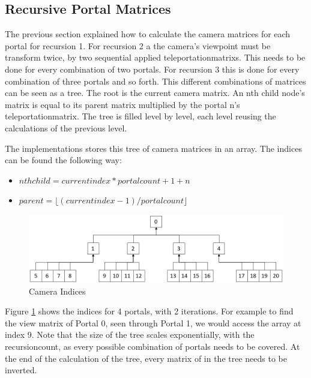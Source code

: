 \subsection{Recursive Portal Matrices}
\label{section:recursivecameramatrices}
The previous section explained how to calculate the camera matrices for each portal for recursion 1. For recursion 2 a the camera's viewpoint must be transform twice, by two sequential applied \glspl{teleportationmatrix}. This needs to be done for every combination of two portals. For recursion 3 this is done for every combination of three portals and so forth. This different combinations of matrices can be seen as a tree. The root is the current camera matrix. An nth child node's matrix is equal to its parent matrix multiplied by the portal n's \gls{teleportationmatrix}. The tree is filled level by level, each level reusing the calculations of the previous level.




The implementations stores this tree of camera matrices in an array. The indices can be found the following way:

\begin{itemize}
	\item $ nth child = current index * portalcount + 1 + n$
	\item $ parent = \lfloor(current index-1)/portal count\rfloor $
\end{itemize}




\begin{figure}[h]
	\includegraphics[width=\linewidth]{images/cameraindices.png}
	\caption{Camera Indices}
	\label{fig:cameraindices}
\end{figure}

Figure \ref{fig:cameraindices} shows the indices for 4 portals, with 2 iterations. For example to find the view matrix of Portal 0, seen through Portal 1, we would access the array at index 9. Note that the size of the tree scales exponentially, with the \gls{recursioncount}, as every possible combination of portals needs to be covered. At the end of the calculation of the tree, every matrix of in the tree needs to be inverted.


